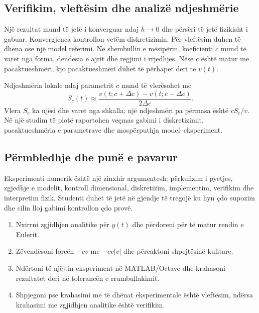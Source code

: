 \subsection{Verifikim, vleftësim dhe analizë ndjeshmërie}
Një rezultat mund të jetë i konverguar ndaj $h\to0$ dhe përsëri të jetë fizikisht i gabuar. Konvergjenca kontrollon vetëm diskretizimin. Për vleftësim duhen të dhëna ose një model referimi. Në shembullin e mësipërm, koeficienti $c$ mund të varet nga forma, dendësia e ajrit dhe regjimi i rrjedhjes. Nëse $c$ është matur me pacaktueshmëri, kjo pacaktueshmëri duhet të përhapet deri te $v(t)$.

Ndjeshmëria lokale ndaj parametrit $c$ mund të vlerësohet me
\begin{equation}
 S_c(t)\approx\frac{v(t;c+\Delta c)-v(t;c-\Delta c)}{2\Delta c}.
\end{equation}
Vlera $S_c$ ka njësi dhe varet nga shkalla; një ndjeshmëri pa përmasa është $cS_c/v$. Në një studim të plotë raportohen veçmas gabimi i diskretizimit, pacaktueshmëria e parametrave dhe mospërputhja model--eksperiment.

\subsection{Përmbledhje dhe punë e pavarur}
Eksperimenti numerik është një zinxhir argumentesh: përkufizim i pyetjes, zgjedhje e modelit, kontroll dimensional, diskretizim, implementim, verifikim dhe interpretim fizik. Studenti duhet të jetë në gjendje të tregojë ku hyn çdo supozim dhe cilin lloj gabimi kontrollon çdo provë.

\begin{enumerate}
\item Nxirrni zgjidhjen analitike për $y(t)$ dhe përdoreni për të matur rendin e Eulerit.
\item Zëvendësoni forcën $-cv$ me $-cv|v|$ dhe përcaktoni shpejtësinë kufitare.
\item Ndërtoni të njëjtin eksperiment në MATLAB/Octave dhe krahasoni rezultatet deri në tolerancën e rrumbullakimit.
\item Shpjegoni pse krahasimi me të dhënat eksperimentale është vleftësim, ndërsa krahasimi me zgjidhjen analitike është verifikim.
\end{enumerate}
